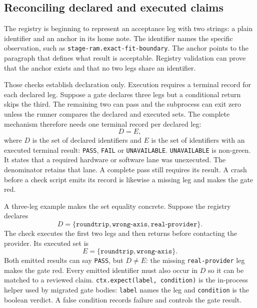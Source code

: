 \documentclass[10pt,aps,prd,twocolumn,nofootinbib]{revtex4-2}
\newcommand{\code}[1]{\texttt{#1}}
\begin{document}
\subsection{Reconciling declared and executed claims}

The registry is beginning to represent an acceptance leg with two strings: a
plain identifier and an anchor in its home note.  The identifier names the
specific observation, such as \code{stage-ram.exact-fit-boundary}.  The anchor
points to the paragraph that defines what result is acceptable.  Registry
validation can prove that the anchor exists and that no two legs share an
identifier.

Those checks establish declaration only.  Execution requires a terminal record
for each declared leg.  Suppose a gate declares three legs but a conditional
return skips the third.  The remaining two can
pass and the subprocess can exit zero unless the runner compares the declared
and executed sets.  The complete mechanism therefore needs one terminal
record per declared leg:
\begin{equation*}
 D=E,
\end{equation*}
where \(D\) is the set of declared identifiers and \(E\) is the set of
identifiers with an executed terminal result: \code{PASS}, \code{FAIL} or
\code{UNAVAILABLE}.
\code{UNAVAILABLE} is non-green.  It states that a required hardware or
software lane was unexecuted.  The denominator retains that lane.  A complete
pass still requires its result.  A crash before a check script emits its
record is likewise a missing leg and makes the gate red.

A three-leg example makes the set equality concrete.  Suppose the registry
declares
\begin{equation*}
 D=\{\code{roundtrip},\code{wrong-axis},\code{real-provider}\}.
\end{equation*}
The check executes the first two legs and then returns before contacting the
provider.  Its executed set is
\begin{equation*}
 E=\{\code{roundtrip},\code{wrong-axis}\}.
\end{equation*}
Both emitted results can say \code{PASS}, but $D\ne E$: the missing
\code{real-provider} leg makes the gate red.  Every emitted identifier must
also occur in $D$ so it can be matched to a reviewed claim.
\code{ctx.expect(label, condition)} is the in-process helper
used by migrated gate bodies: \code{label} names the leg and \code{condition}
is the boolean verdict.  A false condition records failure and controls the
gate result.
\end{document}

